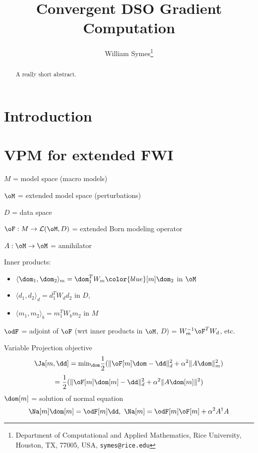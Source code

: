 \title{Convergent DSO Gradient Computation}

\author{
William Symes\thanks{Department of Computational and Applied Mathematics, Rice University,
Houston, TX, 77005, USA,
{\tt symes@rice.edu}}
}



\maketitle
\parskip 12pt

\begin{abstract}
A really short abstract.
\end{abstract}

\section{Introduction} 

\section{VPM for extended FWI}

$M$ = model space (macro models)

$\oM$ = extended model space (perturbations)

$D$ = data space

$\oF: M \rightarrow {\cal L}(\oM, D)$ = extended Born modeling operator

$A: \oM \rightarrow \oM$ = annihilator

Inner products: 
\begin{itemize}
\item $\langle \dom_1,\dom_2\rangle_m = \dom_1^T W_m{\color{blue}[m]}\dom_2$ in $\oM$
\item $\langle d_1,d_2 \rangle_d = d_1^T W_d d_2$ in $D$, 
\item $\langle m_1,m_2\rangle_b = m_1^TW_b m_2 $ in $M$
\end{itemize}

$\odF$ = adjoint of $\oF$ (wrt inner products in $\oM$, $D$) = $W_m^{-1}\oF^TW_d$, etc.

Variable Projection objective
\[
\Ja[m,\dd] = \mbox{min}_{\dom} \frac{1}{2}(\|\oF[m]\dom -\dd\|_d^2 + \alpha^2\|A\dom\|_m^2)
\]
\[
= \frac{1}{2}(\|\oF[m]\dom[m] -\dd\|_d^2 + \alpha^2\|A\dom[m]\|^2)
\]
$\dom[m]$ = solution of normal equation  
\[
\Na[m] \dom[m] = \odF[m] \dd,\,\,\Na[m] = \odF[m]\oF[m] + \alpha^2 A^{\dagger}A
\]

